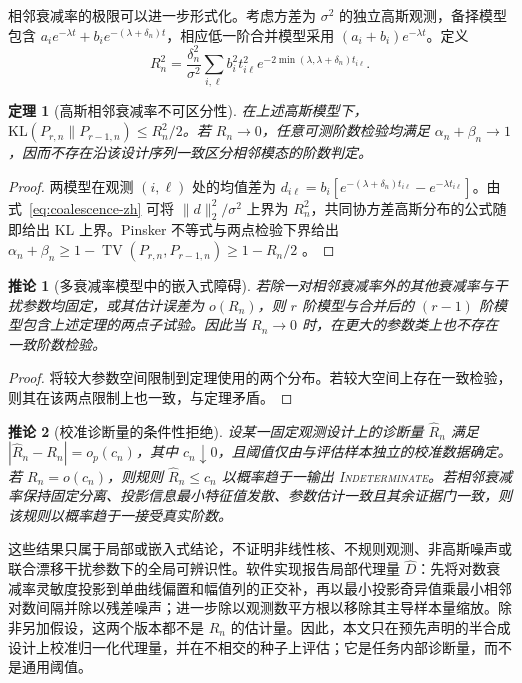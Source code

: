 \documentclass[UTF8,11pt]{ctexart}
\newtheorem{theorem}{定理}
\newtheorem{corollary}{推论}
\newcommand{\indet}{\textsc{Indeterminate}}
\begin{document}
相邻衰减率的极限可以进一步形式化。考虑方差为 $\sigma^2$ 的独立高斯观测，备择模型包含 $a_i e^{-\lambda t}+b_i e^{-(\lambda+\delta_n)t}$，相应低一阶合并模型采用 $(a_i+b_i)e^{-\lambda t}$。定义
\begin{equation}
R_n^2=\frac{\delta_n^2}{\sigma^2}\sum_{i,\ell}b_i^2t_{i\ell}^2
e^{-2\min(\lambda,\lambda+\delta_n)t_{i\ell}}.
\label{eq:boundary-index-zh}
\end{equation}

\begin{theorem}[高斯相邻衰减率不可区分性]
在上述高斯模型下，$\mathrm{KL}(P_{r,n}\|P_{r-1,n})\le R_n^2/2$。若 $R_n\to0$，任意可测阶数检验均满足 $\alpha_n+\beta_n\to1$，因而不存在沿该设计序列一致区分相邻模态的阶数判定。
\end{theorem}
\begin{proof}
两模型在观测 $(i,\ell)$ 处的均值差为 $d_{i\ell}=b_i[e^{-(\lambda+\delta_n)t_{i\ell}}-e^{-\lambda t_{i\ell}}]$。由式~\eqref{eq:coalescence-zh} 可将 $\|d\|_2^2/\sigma^2$ 上界为 $R_n^2$，共同协方差高斯分布的公式随即给出 KL 上界。Pinsker 不等式与两点检验下界给出 $\alpha_n+\beta_n\ge1-\operatorname{TV}(P_{r,n},P_{r-1,n})\ge1-R_n/2$ \cite{tsybakov2009nonparametric}。
\end{proof}

\begin{corollary}[多衰减率模型中的嵌入式障碍]
若除一对相邻衰减率外的其他衰减率与干扰参数均固定，或其估计误差为 $o(R_n)$，则 $r$ 阶模型与合并后的 $(r-1)$ 阶模型包含上述定理的两点子试验。因此当 $R_n\to0$ 时，在更大的参数类上也不存在一致阶数检验。
\end{corollary}
\begin{proof}
将较大参数空间限制到定理使用的两个分布。若较大空间上存在一致检验，则其在该两点限制上也一致，与定理矛盾。
\end{proof}
\begin{corollary}[校准诊断量的条件性拒绝]
设某一固定观测设计上的诊断量 $\widehat R_n$ 满足 $|\widehat R_n-R_n|=o_p(c_n)$，其中 $c_n\downarrow0$，且阈值仅由与评估样本独立的校准数据确定。若 $R_n=o(c_n)$，则规则 $\widehat R_n\le c_n$ 以概率趋于一输出 \indet{}。若相邻衰减率保持固定分离、投影信息最小特征值发散、参数估计一致且其余证据门一致，则该规则以概率趋于一接受真实阶数。
\end{corollary}

这些结果只属于局部或嵌入式结论，不证明非线性核、不规则观测、非高斯噪声或联合漂移干扰参数下的全局可辨识性。软件实现报告局部代理量 $\widehat D$：先将对数衰减率灵敏度投影到单曲线偏置和幅值列的正交补，再以最小投影奇异值乘最小相邻对数间隔并除以残差噪声；进一步除以观测数平方根以移除其主导样本量缩放。除非另加假设，这两个版本都不是 $R_n$ 的估计量。因此，本文只在预先声明的半合成设计上校准归一化代理量，并在不相交的种子上评估；它是任务内部诊断量，而不是通用阈值。
\end{document}
